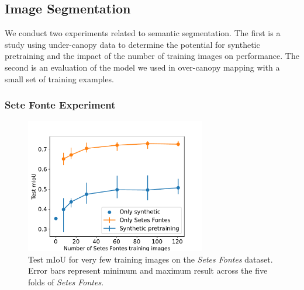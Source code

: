 \subsection{Image Segmentation}
We conduct two experiments related to semantic segmentation. The first is a study using under-canopy data to determine the potential for synthetic pretraining and the impact of the number of training images on performance. The second is an evaluation of the model we used in over-canopy mapping with a small set of training examples.
\subsubsection{Sete Fonte Experiment}

\begin{figure}
    \centering
    \includegraphics[width=0.7\textwidth]{figs/results/semantic_segmentation/synthetic_experiments_mious.pdf}
    \caption{Test mIoU for very few training images on the \textit{Setes Fontes} dataset.
    Error bars represent minimum and maximum result across the five folds of \textit{Setes Fontes}.}
    \label{fig:results:semantic-size-pretraining}
\end{figure}

